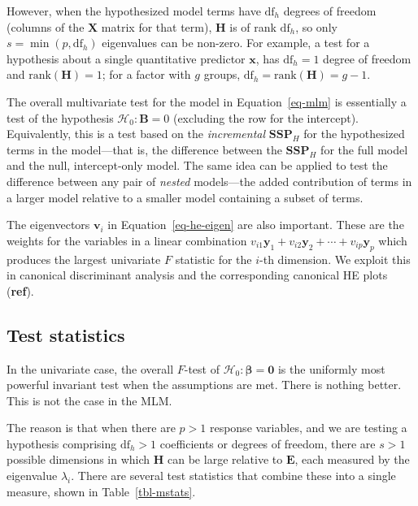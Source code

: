 \documentclass[
  letterpaper,
  10pt,
  krantz2]{krantz}
\begin{document}
However, when the hypothesized model terms have \(\text{df}_h\) degrees
of freedom (columns of the \(\mathbf{X}\) matrix for that term),
\(\mathbf{H}\) is of rank \(\text{df}_h\), so only
\(s=\min(p, \text{df}_h)\) eigenvalues can be non-zero. For example, a
test for a hypothesis about a single quantitative predictor
\(\mathbf{x}\), has \(\text{df}_h = 1\) degree of freedom and
\(\mathrm{rank} (\mathbf{H}) = 1\); for a factor with \(g\) groups,
\(\text{df}_h = \mathrm{rank} (\mathbf{H}) = g-1\).

The overall multivariate test for the model in Equation~\ref{eq-mlm} is
essentially a test of the hypothesis \(\mathcal{H}_0: \mathbf{B} = 0\)
(excluding the row for the intercept). Equivalently, this is a test
based on the \emph{incremental} \(\mathbf{SSP}_{H}\) for the
hypothesized terms in the model---that is, the difference between the
\(\mathbf{SSP}_{H}\) for the full model and the null, intercept-only
model. The same idea can be applied to test the difference between any
pair of \emph{nested} models---the added contribution of terms in a
larger model relative to a smaller model containing a subset of terms.

The eigenvectors \(\mathbf{v}_i\) in Equation~\ref{eq-he-eigen} are also
important. These are the weights for the variables in a linear
combination
\(v_{i1} \mathbf{y}_1 + v_{i2} \mathbf{y}_2 + \cdots + v_{ip} \mathbf{y}_p\)
which produces the largest univariate \(F\) statistic for the \(i\)-th
dimension. We exploit this in canonical discriminant analysis and the
corresponding canonical HE plots (\textbf{ref}).

\subsection{Test statistics}\label{test-statistics}

In the univariate case, the overall \(F\)-test of
\(\mathcal{H}_0: \boldsymbol{\beta} = \mathbf{0}\) is the uniformly most
powerful invariant test when the assumptions are met. There is nothing
better. This is not the case in the MLM.

The reason is that when there are \(p > 1\) response variables, and we
are testing a hypothesis comprising \(\text{df}_h >1\) coefficients or
degrees of freedom, there are \(s > 1\) possible dimensions in which
\(\mathbf{H}\) can be large relative to \(\mathbf{E}\), each measured by
the eigenvalue \(\lambda_i\). There are several test statistics that
combine these into a single measure, shown in Table~\ref{tbl-mstats}.
\end{document}
